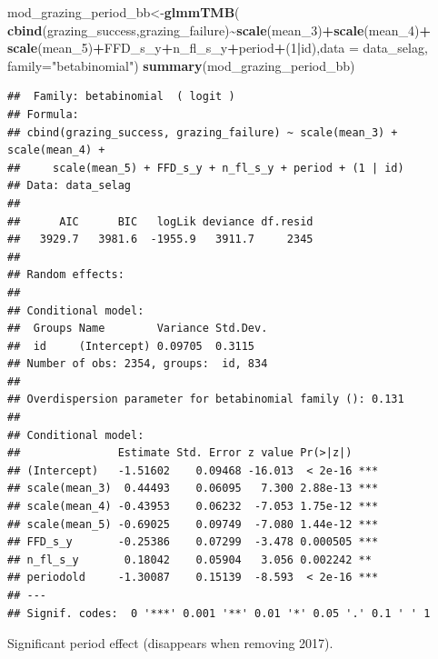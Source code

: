 \documentclass[
]{article}
\newenvironment{Shaded}{\begin{snugshade}}{\end{snugshade}}
\newcommand{\DataTypeTok}[1]{\textcolor[rgb]{0.13,0.29,0.53}{#1}}
\newcommand{\DecValTok}[1]{\textcolor[rgb]{0.00,0.00,0.81}{#1}}
\newcommand{\KeywordTok}[1]{\textcolor[rgb]{0.13,0.29,0.53}{\textbf{#1}}}
\newcommand{\NormalTok}[1]{#1}
\newcommand{\OperatorTok}[1]{\textcolor[rgb]{0.81,0.36,0.00}{\textbf{#1}}}
\newcommand{\StringTok}[1]{\textcolor[rgb]{0.31,0.60,0.02}{#1}}
\begin{document}
\begin{Shaded}
\begin{Highlighting}[]
\NormalTok{mod\_grazing\_period\_bb\textless{}{-}}\KeywordTok{glmmTMB}\NormalTok{(}
  \KeywordTok{cbind}\NormalTok{(grazing\_success,grazing\_failure)}\OperatorTok{\textasciitilde{}}\KeywordTok{scale}\NormalTok{(mean\_}\DecValTok{3}\NormalTok{)}\OperatorTok{+}\KeywordTok{scale}\NormalTok{(mean\_}\DecValTok{4}\NormalTok{)}\OperatorTok{+}
\StringTok{    }\KeywordTok{scale}\NormalTok{(mean\_}\DecValTok{5}\NormalTok{)}\OperatorTok{+}\NormalTok{FFD\_s\_y}\OperatorTok{+}\NormalTok{n\_fl\_s\_y}\OperatorTok{+}\NormalTok{period}\OperatorTok{+}\NormalTok{(}\DecValTok{1}\OperatorTok{|}\NormalTok{id),}\DataTypeTok{data =}\NormalTok{ data\_selag,}
  \DataTypeTok{family=}\StringTok{"betabinomial"}\NormalTok{)}
\KeywordTok{summary}\NormalTok{(mod\_grazing\_period\_bb)}
\end{Highlighting}
\end{Shaded}

\begin{verbatim}
##  Family: betabinomial  ( logit )
## Formula:          
## cbind(grazing_success, grazing_failure) ~ scale(mean_3) + scale(mean_4) +  
##     scale(mean_5) + FFD_s_y + n_fl_s_y + period + (1 | id)
## Data: data_selag
## 
##      AIC      BIC   logLik deviance df.resid 
##   3929.7   3981.6  -1955.9   3911.7     2345 
## 
## Random effects:
## 
## Conditional model:
##  Groups Name        Variance Std.Dev.
##  id     (Intercept) 0.09705  0.3115  
## Number of obs: 2354, groups:  id, 834
## 
## Overdispersion parameter for betabinomial family (): 0.131 
## 
## Conditional model:
##               Estimate Std. Error z value Pr(>|z|)    
## (Intercept)   -1.51602    0.09468 -16.013  < 2e-16 ***
## scale(mean_3)  0.44493    0.06095   7.300 2.88e-13 ***
## scale(mean_4) -0.43953    0.06232  -7.053 1.75e-12 ***
## scale(mean_5) -0.69025    0.09749  -7.080 1.44e-12 ***
## FFD_s_y       -0.25386    0.07299  -3.478 0.000505 ***
## n_fl_s_y       0.18042    0.05904   3.056 0.002242 ** 
## periodold     -1.30087    0.15139  -8.593  < 2e-16 ***
## ---
## Signif. codes:  0 '***' 0.001 '**' 0.01 '*' 0.05 '.' 0.1 ' ' 1
\end{verbatim}

Significant period effect (disappears when removing 2017).
\end{document}

